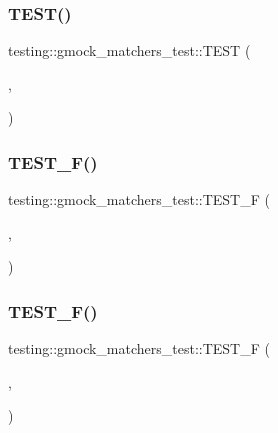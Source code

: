 \mbox{\label{namespacetesting_1_1gmock__matchers__test_a5e9f41e9a39a6de9c69d06250d62a67a}} 
\subsubsection{\texorpdfstring{TEST()}{TEST()}\hspace{0.1cm}{\footnotesize\ttfamily [350/350]}}
{\footnotesize\ttfamily testing\+::gmock\+\_\+matchers\+\_\+test\+::\+T\+E\+ST (\begin{DoxyParamCaption}\item[{Any\+With\+Test}]{,  }\item[{Explains\+Self}]{ }\end{DoxyParamCaption})}

\mbox{\label{namespacetesting_1_1gmock__matchers__test_a69257e935b4334c835b3ad26acea9104}} 
\subsubsection{\texorpdfstring{TEST\_F()}{TEST\_F()}\hspace{0.1cm}{\footnotesize\ttfamily [1/40]}}
{\footnotesize\ttfamily testing\+::gmock\+\_\+matchers\+\_\+test\+::\+T\+E\+S\+T\+\_\+F (\begin{DoxyParamCaption}\item[{\mbox{\hyperlink{namespacetesting_1_1gmock__matchers__test_a145329e433869625f9f0e98a0cdfd7b4}{Float\+Test}}}]{,  }\item[{Float\+Eq\+Approximately\+Matches\+Floats}]{ }\end{DoxyParamCaption})}

\mbox{\label{namespacetesting_1_1gmock__matchers__test_abb691880cd22f6f444c978547b13f792}} 
\subsubsection{\texorpdfstring{TEST\_F()}{TEST\_F()}\hspace{0.1cm}{\footnotesize\ttfamily [2/40]}}
{\footnotesize\ttfamily testing\+::gmock\+\_\+matchers\+\_\+test\+::\+T\+E\+S\+T\+\_\+F (\begin{DoxyParamCaption}\item[{\mbox{\hyperlink{namespacetesting_1_1gmock__matchers__test_a145329e433869625f9f0e98a0cdfd7b4}{Float\+Test}}}]{,  }\item[{Nan\+Sensitive\+Float\+Eq\+Approximately\+Matches\+Floats}]{ }\end{DoxyParamCaption})}

